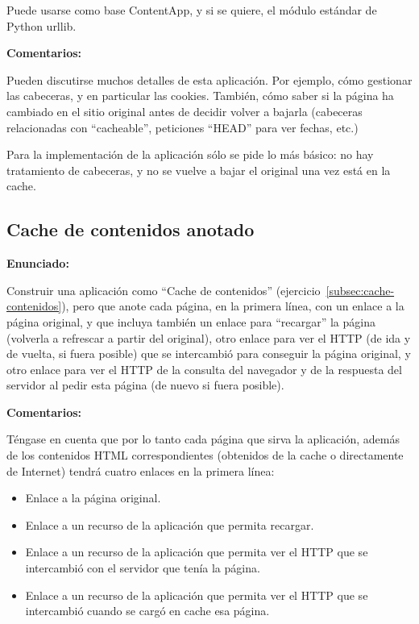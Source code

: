 Puede usarse como base ContentApp, y si se quiere, el módulo estándar de Python urllib.

\textbf{Comentarios:}

Pueden discutirse muchos detalles de esta aplicación. Por ejemplo, cómo gestionar las cabeceras, y en particular las cookies. También, cómo saber si la página ha cambiado en el sitio original antes de decidir volver a bajarla (cabeceras relacionadas con ``cacheable'', peticiones ``HEAD'' para ver fechas, etc.)

Para la implementación de la aplicación sólo se pide lo más básico: no hay tratamiento de cabeceras, y no se vuelve a bajar el original una vez está en la cache.

\subsection{Cache de contenidos anotado}
\label{subsec:cache-contenidos-anotado}

\textbf{Enunciado:}

Construir una aplicación como ``Cache de contenidos'' (ejercicio~\ref{subsec:cache-contenidos}), pero que anote cada página, en la primera línea, con un enlace a la página original, y que incluya también un enlace para ``recargar'' la página (volverla a refrescar a partir del original), otro enlace para ver el HTTP (de ida y de vuelta, si fuera posible) que se intercambió para conseguir la página original, y otro enlace para ver el HTTP de la consulta del navegador y de la respuesta del servidor al pedir esta página (de nuevo si fuera posible).

\textbf{Comentarios:}

Téngase en cuenta que por lo tanto cada página que sirva la aplicación, además de los contenidos  HTML correspondientes (obtenidos de la cache o directamente de Internet) tendrá cuatro enlaces en la primera línea:

\begin{itemize}
\item Enlace a la página original.
\item Enlace a un recurso de la aplicación que permita recargar.
\item Enlace a un recurso de la aplicación que permita ver el HTTP que se intercambió con el servidor que tenía la página.
\item Enlace a un recurso de la aplicación que permita ver el HTTP que se intercambió cuando se cargó en cache esa página.
\end{itemize}

